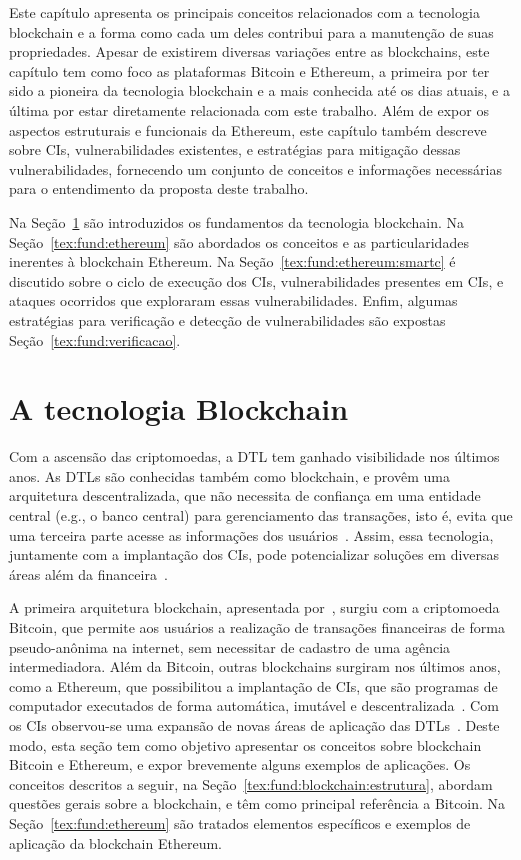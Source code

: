 Este capítulo apresenta os principais conceitos relacionados com a tecnologia blockchain e a forma como cada um deles contribui para a manutenção de suas propriedades. Apesar de existirem diversas variações entre as blockchains, este capítulo tem como foco as plataformas Bitcoin e Ethereum, a primeira por ter sido a pioneira da tecnologia blockchain e a mais conhecida até os dias atuais, e a última por estar diretamente relacionada com este trabalho. Além de expor os aspectos estruturais e funcionais da Ethereum, este capítulo também descreve sobre CIs, vulnerabilidades existentes, e estratégias para mitigação dessas vulnerabilidades, fornecendo um conjunto de conceitos e informações necessárias para o entendimento da proposta deste trabalho.

Na Seção~\ref{tex:fund:blockchain} são introduzidos os fundamentos da tecnologia blockchain. Na Seção~\ref{tex:fund:ethereum} são abordados os conceitos e as particularidades inerentes à blockchain Ethereum. Na Seção~\ref{tex:fund:ethereum:smartc} é discutido sobre o ciclo de execução dos CIs, vulnerabilidades presentes em CIs, e ataques ocorridos que exploraram essas vulnerabilidades. Enfim, algumas estratégias para verificação e detecção de vulnerabilidades são expostas Seção~\ref{tex:fund:verificacao}. 

\section{A tecnologia Blockchain} \label{tex:fund:blockchain}

Com a ascensão das criptomoedas, a DTL tem ganhado visibilidade nos últimos anos. As DTLs são conhecidas também como blockchain, e provêm uma arquitetura descentralizada, que não necessita de confiança em uma entidade central (e.g., o banco central) para gerenciamento das transações, isto é, evita que uma terceira parte acesse as informações dos usuários~\cite{monrat2019survey-blockchain-ieee}. Assim, essa tecnologia, juntamente com a implantação dos CIs, pode potencializar soluções em diversas áreas além da financeira~\cite{swan2015blockchain-book}.

A primeira arquitetura blockchain, apresentada por~, surgiu com a criptomoeda Bitcoin, que permite aos usuários a realização de transações financeiras de forma pseudo-anônima na internet, sem necessitar de cadastro de uma agência intermediadora. Além da Bitcoin, outras blockchains surgiram nos últimos anos, como a Ethereum, que possibilitou a implantação de CIs, que são programas de computador executados de forma automática, imutável e descentralizada~\cite{ethereum2014whitepaper}. Com os CIs observou-se uma expansão de novas áreas de aplicação das DTLs~\cite{maesa2020blockchain3.0}. Deste modo, esta seção tem como objetivo apresentar os conceitos sobre blockchain Bitcoin e Ethereum, e expor brevemente alguns exemplos de aplicações. Os conceitos descritos a seguir, na Seção~\ref{tex:fund:blockchain:estrutura}, abordam questões gerais sobre a blockchain, e têm como principal referência a Bitcoin. Na Seção~\ref{tex:fund:ethereum} são tratados elementos específicos e exemplos de aplicação da blockchain Ethereum.

